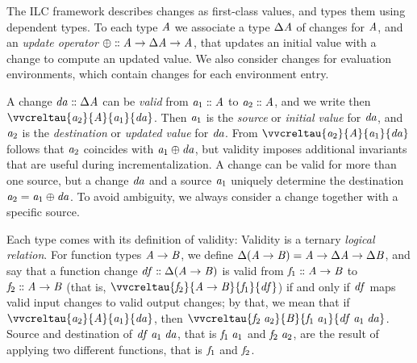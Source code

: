 The ILC framework describes changes as first-class values, and types them using
dependent types. To each type \ensuremath{\Conid{A}} we associate a type \ensuremath{\Delta \Conid{A}} of changes for
\ensuremath{\Conid{A}}, and an \emph{update operator} \ensuremath{\oplus \mathrel{:\mkern-1mu:}\Conid{A}\to \Delta \Conid{A}\to \Conid{A}}, that updates an
initial value with a change to compute an updated value.
We also consider changes for evaluation environments, which contain changes for
each environment entry.

A change \ensuremath{\Varid{da}\mathrel{:\mkern-1mu:}\Delta \Conid{A}} can be \emph{valid} from \ensuremath{\Varid{a}_{1}\mathrel{:\mkern-1mu:}\Conid{A}} to \ensuremath{\Varid{a}_{2}\mathrel{:\mkern-1mu:}\Conid{A}}, and we write
then \ensuremath{\vvcreltau{\Varid{a}_{2}}{\Conid{A}}{\Varid{a}_{1}}{\Varid{da}}}. Then \ensuremath{\Varid{a}_{1}} is the \emph{source} or \emph{initial value}
for \ensuremath{\Varid{da}}, and \ensuremath{\Varid{a}_{2}} is the \emph{destination} or \emph{updated value} for \ensuremath{\Varid{da}}.
From \ensuremath{\vvcreltau{\Varid{a}_{2}}{\Conid{A}}{\Varid{a}_{1}}{\Varid{da}}} follows that \ensuremath{\Varid{a}_{2}} coincides with \ensuremath{\Varid{a}_{1}\oplus \Varid{da}}, but
validity imposes additional invariants that are useful during
incrementalization.
A change can be valid for more than one source, but a change \ensuremath{\Varid{da}} and a source
\ensuremath{\Varid{a}_{1}} uniquely determine the destination \ensuremath{\Varid{a}_{2}\mathrel{=}\Varid{a}_{1}\oplus \Varid{da}}.
To avoid ambiguity, we always consider a change together with a specific source.

Each type comes with its definition of validity: Validity is a ternary
\emph{logical relation}.
%
For function types \ensuremath{\Conid{A}\to \Conid{B}}, we
define \ensuremath{\Delta (\Conid{A}\to \Conid{B})\mathrel{=}\Conid{A}\to \Delta \Conid{A}\to \Delta \Conid{B}}, and say that
a function change \ensuremath{\Varid{df}\mathrel{:\mkern-1mu:}\Delta (\Conid{A}\to \Conid{B})} is valid from \ensuremath{\Varid{f}_{1}\mathrel{:\mkern-1mu:}\Conid{A}\to \Conid{B}} to \ensuremath{\Varid{f}_{2}\mathrel{:\mkern-1mu:}\Conid{A}\to \Conid{B}} (that is, \ensuremath{\vvcreltau{\Varid{f}_{2}}{\Conid{A}\to \Conid{B}}{\Varid{f}_{1}}{\Varid{df}}}) if and only if \ensuremath{\Varid{df}} maps valid input
changes to valid output changes; by that,
we mean that if \ensuremath{\vvcreltau{\Varid{a}_{2}}{\Conid{A}}{\Varid{a}_{1}}{\Varid{da}}}, then \ensuremath{\vvcreltau{\Varid{f}_{2}\;\Varid{a}_{2}}{\Conid{B}}{\Varid{f}_{1}\;\Varid{a}_{1}}{\Varid{df}\;\Varid{a}_{1}\;\Varid{da}}}.
Source and destination of \ensuremath{\Varid{df}\;\Varid{a}_{1}\;\Varid{da}}, that is \ensuremath{\Varid{f}_{1}\;\Varid{a}_{1}} and \ensuremath{\Varid{f}_{2}\;\Varid{a}_{2}}, are the result of
applying two different functions, that is \ensuremath{\Varid{f}_{1}} and \ensuremath{\Varid{f}_{2}}.

